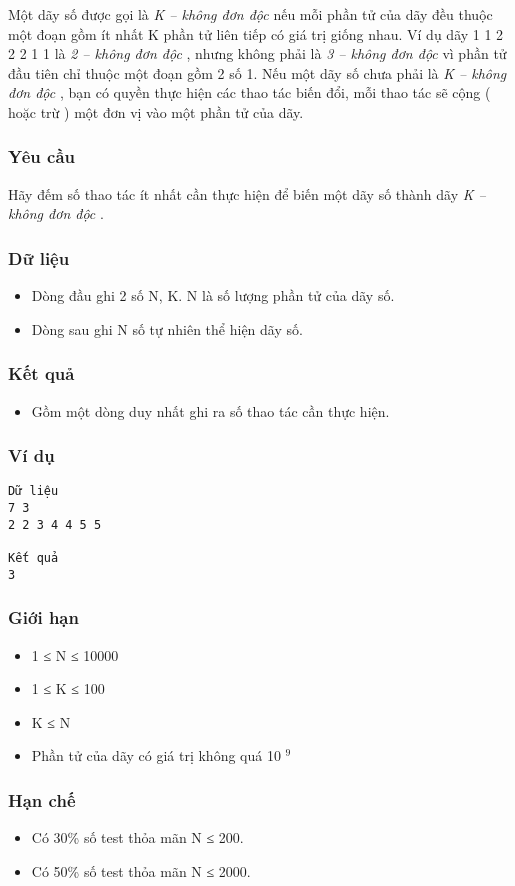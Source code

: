 



   Một dãy số được gọi là   \textit{    K – không đơn độc   }   nếu mỗi phần tử của dãy đều thuộc một đoạn gồm ít nhất       K      phần tử liên tiếp có giá trị giống nhau. Ví dụ dãy 1 1 2 2 2 1 1 là   \textit{    2 – không đơn độc   }   , nhưng không phải là   \textit{    3 – không đơn độc   }   vì phần tử đầu tiên chỉ thuộc một đoạn gồm 2 số 1. Nếu một dãy số chưa phải là   \textit{    K – không đơn độc   }   , bạn có quyền thực hiện các thao tác biến đổi, mỗi thao tác sẽ cộng ( hoặc trừ ) một đơn vị vào một phần tử của dãy.  

\subsubsection{   Yêu cầu  }

   Hãy đếm số thao tác ít nhất cần thực hiện để biến một dãy số thành dãy   \textit{    K – không đơn độc   }   .  

\subsubsection{   Dữ liệu  }
\begin{itemize}
	\item     Dòng đầu ghi 2 số N, K. N là số lượng phần tử của dãy số.   
	\item     Dòng sau ghi N số tự nhiên thể hiện dãy số.   
\end{itemize}

\subsubsection{   Kết quả  }
\begin{itemize}
	\item     Gồm một dòng duy nhất ghi ra số thao tác cần thực hiện.   
\end{itemize}

\subsubsection{   Ví dụ  }
\begin{verbatim}
Dữ liệu
7 3
2 2 3 4 4 5 5

Kết quả
3
\end{verbatim}

\subsubsection{   Giới hạn  }
\begin{itemize}
	\item     1 ≤ N ≤ 10000   
	\item     1 ≤ K ≤ 100   
	\item     K ≤ N   
	\item     Phần tử của dãy có giá trị không quá 10    $^     9    $
\end{itemize}

\subsubsection{   Hạn chế  }
\begin{itemize}
	\item     Có 30\% số test thỏa mãn N ≤ 200.   
	\item     Có 50\% số test thỏa mãn N ≤ 2000.   
\end{itemize}